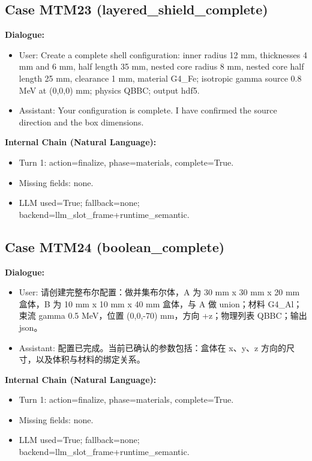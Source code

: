 \documentclass[11pt]{ctexart}
\begin{document}
\subsection{Case MTM23 (layered\_shield\_complete)}
\textbf{Dialogue:}
\begin{itemize}
\item User: Create a complete shell configuration: inner radius 12 mm, thicknesses 4 mm and 6 mm, half length 35 mm, nested core radius 8 mm, nested core half length 25 mm, clearance 1 mm, material G4\_Fe; isotropic gamma source 0.8 MeV at (0,0,0) mm; physics QBBC; output hdf5.
\item Assistant: Your configuration is complete. I have confirmed the source direction and the box dimensions.
\end{itemize}
\textbf{Internal Chain (Natural Language):}
\begin{itemize}
\item Turn 1: action=finalize, phase=materials, complete=True.
\item Missing fields: none.
\item LLM used=True; fallback=none; backend=llm\_slot\_frame+runtime\_semantic.
\end{itemize}
\subsection{Case MTM24 (boolean\_complete)}
\textbf{Dialogue:}
\begin{itemize}
\item User: 请创建完整布尔配置：做并集布尔体，A 为 30 mm x 30 mm x 20 mm 盒体，B 为 10 mm x 10 mm x 40 mm 盒体，与 A 做 union；材料 G4\_Al；束流 gamma 0.5 MeV，位置 (0,0,-70) mm，方向 +z；物理列表 QBBC；输出 json。
\item Assistant: 配置已完成。当前已确认的参数包括：盒体在 x、y、z 方向的尺寸，以及体积与材料的绑定关系。
\end{itemize}
\textbf{Internal Chain (Natural Language):}
\begin{itemize}
\item Turn 1: action=finalize, phase=materials, complete=True.
\item Missing fields: none.
\item LLM used=True; fallback=none; backend=llm\_slot\_frame+runtime\_semantic.
\end{itemize}
\end{document}
